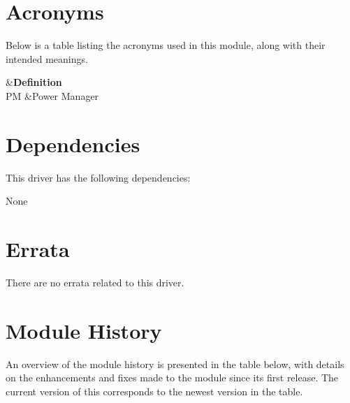 \hypertarget{asfdoc_sam0_system_extra_asfdoc_sam0_system_extra_acronyms}{}\section{Acronyms}\label{asfdoc_sam0_system_extra_asfdoc_sam0_system_extra_acronyms}
Below is a table listing the acronyms used in this module, along with their intended meanings.

\begin{TabularC}{2}
\hline
{}&{\bf Definition  }\\
P\+M &Power Manager  \\
\end{TabularC}
\hypertarget{asfdoc_sam0_system_extra_asfdoc_sam0_system_extra_dependencies}{}\section{Dependencies}\label{asfdoc_sam0_system_extra_asfdoc_sam0_system_extra_dependencies}
This driver has the following dependencies\+:


\begin{DoxyItemize}
\item None
\end{DoxyItemize}\hypertarget{asfdoc_sam0_system_extra_asfdoc_sam0_system_extra_errata}{}\section{Errata}\label{asfdoc_sam0_system_extra_asfdoc_sam0_system_extra_errata}
There are no errata related to this driver.\hypertarget{asfdoc_sam0_system_extra_asfdoc_sam0_system_extra_history}{}\section{Module History}\label{asfdoc_sam0_system_extra_asfdoc_sam0_system_extra_history}
An overview of the module history is presented in the table below, with details on the enhancements and fixes made to the module since its first release. The current version of this corresponds to the newest version in the table.

\begin{TabularC}{1}
\hline
{}\\
\end{TabularC}

